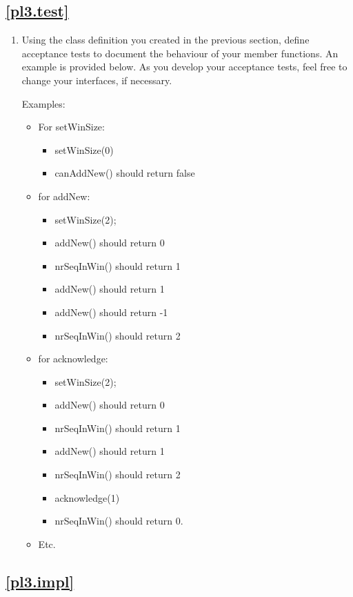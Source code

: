 \documentclass[12pt]{book}
\begin{document}
\subsection{\ref{pl3.test}}

\begin{enumerate}[resume*]
\item Using the class definition you created in the previous section, define acceptance tests to document the behaviour of your member functions. An example is provided below. As you develop your acceptance tests, feel free to change your interfaces, if necessary.

  Examples:
  \begin{itemize}[label=--]
  \item For setWinSize:
    \begin{itemize}
    \item setWinSize(0)
      \item canAddNew() should return false
    \end{itemize}
  \item for addNew:
    \begin{itemize}
    \item setWinSize(2);
    \item addNew() should return 0
    \item nrSeqInWin() should return 1
    \item addNew() should return 1
    \item addNew() should return -1
    \item nrSeqInWin() should return 2
    \end{itemize}
  \item for acknowledge:
    \begin{itemize}
    \item setWinSize(2);
    \item addNew() should return 0
    \item nrSeqInWin() should return 1
    \item addNew() should return 1
    \item nrSeqInWin() should return 2
    \item acknowledge(1)
    \item nrSeqInWin() should return 0.
    \end{itemize}
    \item Etc.
  \end{itemize}
\end{enumerate}


\subsection{\ref{pl3.impl}}\label{sec.impl}
\end{document}
